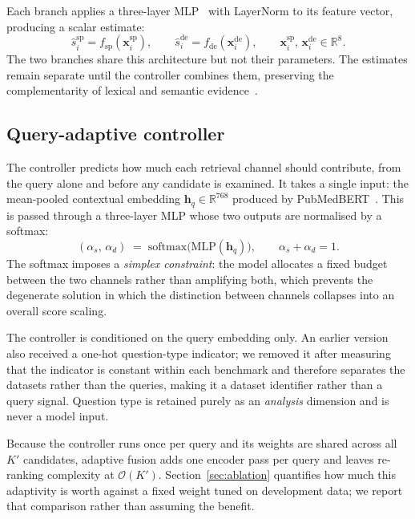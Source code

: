 Each branch applies a three-layer MLP~\cite{goodfellow2016deep} with LayerNorm
to its feature vector, producing a scalar estimate:
%
\begin{equation}
  \hat{s}_i^{\mathrm{sp}} = f_{\mathrm{sp}}\!\left(\mathbf{x}_i^{\mathrm{sp}}\right),
  \qquad
  \hat{s}_i^{\mathrm{de}} = f_{\mathrm{de}}\!\left(\mathbf{x}_i^{\mathrm{de}}\right),
  \qquad
  \mathbf{x}_i^{\mathrm{sp}},\, \mathbf{x}_i^{\mathrm{de}} \in \mathbb{R}^{8}.
  \label{eq:branches}
\end{equation}
%
The two branches share this architecture but not their parameters. The
estimates remain separate until the controller combines them, preserving the
complementarity of lexical and semantic evidence~\cite{burges2005ranknet}.

\subsection{Query-adaptive controller}
\label{sec:controller}

The controller predicts how much each retrieval channel should contribute,
from the query alone and before any candidate is examined. It takes a single
input: the mean-pooled contextual embedding
$\mathbf{h}_q \in \mathbb{R}^{768}$ produced by
PubMedBERT~\cite{gu2021pubmedbert}. This is passed through a three-layer MLP
whose two outputs are normalised by a softmax:
%
\begin{equation}
  (\alpha_s,\, \alpha_d)
  \;=\;
  \mathrm{softmax}\!\big(\mathrm{MLP}(\mathbf{h}_q)\big),
  \qquad \alpha_s + \alpha_d = 1.
  \label{eq:controller}
\end{equation}
%
The softmax imposes a \emph{simplex constraint}: the model allocates a fixed
budget between the two channels rather than amplifying both, which prevents
the degenerate solution in which the distinction between channels collapses
into an overall score scaling.

The controller is conditioned on the query embedding only. An earlier version
also received a one-hot question-type indicator; we removed it after measuring
that the indicator is constant within each benchmark and therefore separates
the datasets rather than the queries, making it a dataset identifier rather
than a query signal. Question type is retained purely as an \emph{analysis}
dimension and is never a model input.

Because the controller runs once per query and its weights are shared across
all $K'$ candidates, adaptive fusion adds one encoder pass per query and
leaves re-ranking complexity at $\mathcal{O}(K')$. Section~\ref{sec:ablation}
quantifies how much this adaptivity is worth against a fixed weight tuned on
development data; we report that comparison rather than assuming the benefit.

